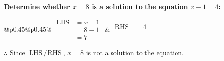 \documentclass[12pt, varwidth, border={5mm 5mm 5mm 5mm}]{standalone}
\begin{document}
    \noindent \textbf{Determine whether \(x = 8\) is a solution to the equation \(x - 1 = 4\):}
\vspace{2pt}  %

\noindent
\renewcommand{\arraystretch}{1.3} %
\begin{tabular}{@{}p{0.45\linewidth}@{}p{0.45\linewidth}@{}}
    \(\begin{aligned}
        \text{LHS} &= x - 1 \\
                   &= 8 - 1 \\
                   &= 7 
    \end{aligned}\) &
    \(\begin{aligned}
        \text{RHS} &= 4\\
                   & \\
                   &
    \end{aligned}\)
\end{tabular}
\renewcommand{\arraystretch}{1.0} %
\vspace{2pt}  %

\noindent \(\therefore\) Since \(\text{LHS} \neq \text{RHS}\), \(x = 8\) is not  a solution to the equation.
\end{document}
